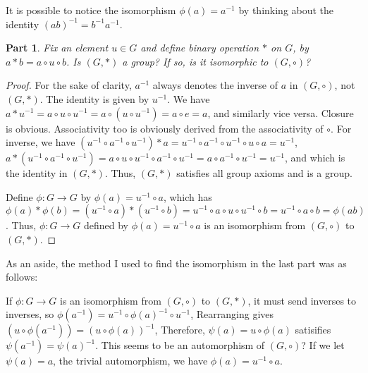 \documentclass[12pt]{article}
\theoremstyle{customstyle}
\newtheorem{subquestion}{Part}[question]
\begin{document}
It is possible to notice the isomorphism $\phi(a) = a^{-1}$
by thinking about the identity $(ab)^{-1} = b^{-1}a^{-1}$.

\begin{subquestion}
    Fix an element $u \in G$ and define binary operation $*$ on $G$,
    by $a * b = a \circ u \circ b$. Is $(G,*)$ a group? If so, is it isomorphic to $(G,\circ)$?
\end{subquestion}

\begin{proof}
    For the sake of clarity, $a^{-1}$ always denotes the inverse of $a$ in $(G,\circ)$, not $(G,*)$.
    The identity is given by $u^{-1}$.
    We have $a * u^{-1} = a \circ u \circ u^{-1} = a \circ (u \circ u^{-1}) = a \circ e = a$,
    and similarly vice versa. Closure is obvious.
    Associativity too is obviously derived from the associativity of $\circ$.
    For inverse, we have
    $(u^{-1} \circ a^{-1} \circ u^{-1}) * a = u^{-1} \circ a^{-1} \circ u^{-1} \circ u \circ a = u^{-1}$,
    $a * (u^{-1} \circ a^{-1} \circ u^{-1}) = a \circ u \circ u^{-1} \circ a^{-1} \circ u^{-1} = a \circ a^{-1} \circ u^{-1} = u^{-1}$, and
    which is the identity in $(G,*)$. Thus, $(G,*)$ satisfies all group axioms and is a group.

    Define $\phi : G \to G$ by $\phi(a) = u^{-1} \circ a$, which has
    $\phi(a)*\phi(b) = (u^{-1}\circ a) * (u^{-1} \circ b)
    = u^{-1} \circ a \circ u \circ u^{-1} \circ b = u^{-1} \circ a \circ b = \phi(ab) $.
    Thus, $\phi : G \to G$ defined by $\phi(a) = u^{-1} \circ a$ is an isomorphism from $(G,\circ)$ to $(G,*)$.
\end{proof}

As an aside, the method I used to find the isomorphism in the last part 
was as follows:

If $\phi : G \to G$ is an isomorphism from $(G,\circ)$ to $(G,*)$, 
it must send inverses to inverses, so $\phi(a^{-1}) = u^{-1} \circ \phi(a)^{-1} \circ u^{-1}$,
Rearranging gives $(u \circ \phi(a^{-1})) = (u \circ \phi(a))^{-1}$,
Therefore, $\psi(a) = u \circ \phi(a)$ satisifies $\psi(a^{-1}) = \psi(a)^{-1}$.
This seems to be an automorphism of $(G,\circ)$?
If we let $\psi(a) = a$, the trivial automorphism,
we have $\phi(a) = u^{-1} \circ a$.
\end{document}
